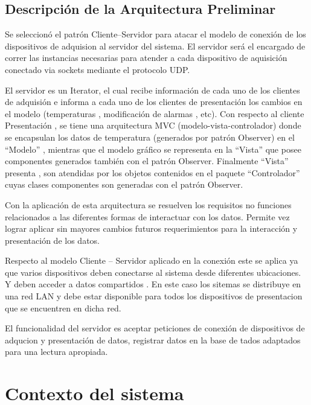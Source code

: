 \subsection{\textcolor[gray]{.2}{Descripción de la Arquitectura Preliminar}}
Se seleccionó el patrón Cliente–Servidor para atacar el modelo de conexión de
los dispositivos de adquision al servidor del sistema. El servidor será el
encargado de correr las instancias necesarias para atender a cada dispositivo
de aquisición conectado via sockets mediante el protocolo UDP.

El servidor es un Iterator, el cual recibe información de cada uno de los
clientes de adquisión e informa a cada uno de los clientes de presentación los
cambios en el modelo (temperaturas , modificación de alarmas , etc).
Con respecto al cliente Presentación , se tiene una arquitectura MVC
(modelo-vista-controlador) donde se encapsulan los datos  de
temperatura (generados por patrón Observer) en el “Modelo” , mientras que el
modelo gráfico se representa en la “Vista” que posee componentes generados
también con el patrón Observer. Finalmente “Vista” presenta , son atendidas por
los objetos contenidos en el paquete “Controlador” cuyas clases componentes son
generadas con el patrón Observer.

Con la aplicación de esta arquitectura se resuelven los requisitos no funciones
relacionados a las diferentes formas de interactuar con los datos.
Permite vez lograr aplicar sin mayores cambios futuros requerimientos para la
interacción y presentación de los datos.

Respecto al modelo Cliente – Servidor aplicado en la conexión este se
aplica ya que varios dispositivos deben conectarse al sistema  desde diferentes
ubicaciones. Y deben acceder a datos compartidos . En este caso los sitemas se
distribuye en una red LAN y debe estar disponible para todos los dispositivos de
presentacion que se encuentren en dicha red.

El funcionalidad del servidor es aceptar peticiones de conexión de dispositivos
de adqucion y presentación de datos, registrar datos en la base de tados
adaptados para una lectura apropiada.

\newpage
\section{\textcolor[gray]{.2}{Contexto del sistema}}
